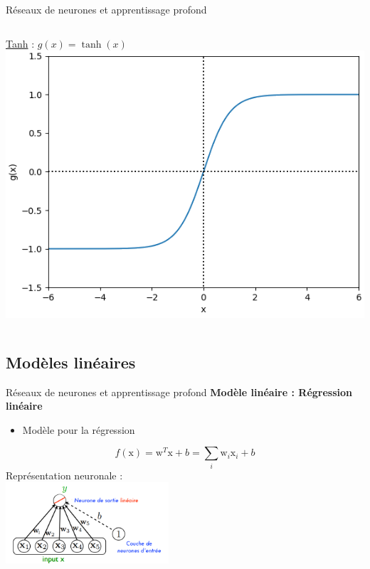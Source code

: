 \documentclass[french]{beamer}
\begin{document}
\begin{frame}{Réseaux de neurones et apprentissage profond}
\begin{columns}[T]
\begin{column}{.48\textwidth}
\begin{center}
\underline{Tanh} : $g(x) = \tanh(x)$\\
\includegraphics[width=.6\linewidth]{figures/tanh}
\end{center}
\end{column}
\end{columns}
\end{frame}

\subsection{Modèles linéaires}

\begin{frame}{Réseaux de neurones et apprentissage profond}
\textbf{Modèle linéaire : Régression linéaire}
\vspace{0.5cm}
\begin{itemize}
	\item Modèle pour la régression
\end{itemize}
$$ f(\mathrm{x}) = \mathrm{w}^T\mathrm{x} + b = \sum_i \mathrm{w}_i \mathrm{x}_i + b $$
Représentation neuronale :\\
\centering
\includegraphics[height=3cm]{figures/linear_regression}
\end{frame}
\end{document}
